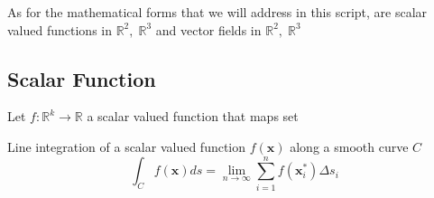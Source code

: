 \documentclass[../main.tex]{subfiles}
\begin{document}
	\par As for the mathematical forms that we will address in this script, are scalar valued functions in $\mathbb{R}^2, \; \mathbb{R}^3$ and  vector fields in $\mathbb{R}^2, \; \mathbb{R}^3$

	\newpage
	\subsection{Scalar Function}
		Let $f: \mathbb{R}^k \rightarrow \mathbb{R}$ a scalar valued function that maps set 
		\begin{definition}
			Line integration of a scalar valued function $f(\mathbf{x})$ along a smooth curve $C$
			\begin{equation}
				\int_C f(\mathbf{x}) ds = \lim_{n \rightarrow \infty} \sum_{i=1}^n f(\mathbf{x}_i^*) \Delta s_i 
			\end{equation}
		\end{definition}
		
\end{document}
